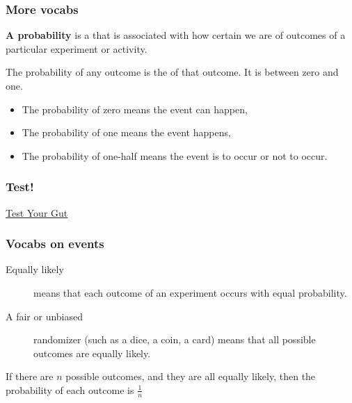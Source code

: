 \begin{frame}
\frametitle{More vocabs}
\begin{block}{}
\textbf{A probability} is a  that is associated with how certain we are of outcomes of a particular experiment or activity.
\end{block}

\begin{block}{}
The probability of any outcome is the  of that outcome. It is between zero and one.
\begin{itemize}
\item The probability of zero means the event can  happen,
\item The probability of one means the event  happens,
\item The probability of one-half means the event is  to occur or not to occur.
\end{itemize}
\end{block}
\end{frame}

\begin{frame}
\end{frame}

\begin{frame}
\frametitle{Test!}
\begin{center}
{\Huge \href{https://www.menti.com/sn8imsvvw2}{Test Your Gut}}
\end{center}
\end{frame}

\begin{frame}
\frametitle{Vocabs on events}
\begin{block}{}
\begin{description}
\item[Equally likely] means that each outcome of an experiment occurs with equal probability.
\item[A fair or unbiased] randomizer (such as a dice, a coin, a card) means that all possible outcomes are equally likely.
\end{description}
\end{block}

\begin{thm}{}{}
If there are $n$ possible outcomes, and they are all equally likely, then the probability of each outcome is $\frac{1}{n}$
\end{thm}
\end{frame}

